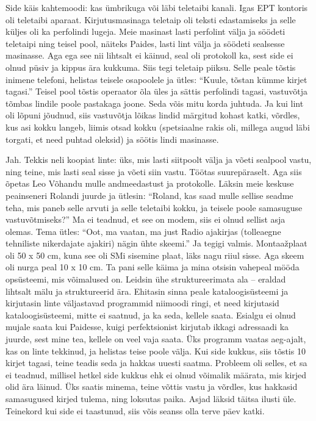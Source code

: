 Side käis kahtemoodi: kas ümbrikuga või läbi teletaibi kanali. Igas EPT 
kontoris oli teletaibi aparaat. Kirjutusmasinaga teletaip oli teksti edastamiseks ja selle küljes oli ka perfolindi lugeja. Meie 
masinast lasti perfolint välja ja söödeti teletaipi ning teisel pool, näiteks 
Paides, lasti lint välja ja söödeti sealsesse masinasse. Aga ega see nii 
lihtsalt ei käinud, seal oli protokoll ka, sest side ei olnud püsiv 
ja kippus ära kukkuma. Siis tegi teletaip piiksu. Selle 
peale tõstis inimene telefoni, helistas teisele osapoolele ja ütles: 
\enquote{Kuule, tõstan kümme kirjet tagasi.} Teisel pool tõstis operaator õla 
üles ja sättis perfolindi tagasi, vastuvõtja tõmbas lindile poole pastakaga 
joone. Seda võis mitu korda juhtuda. Ja kui lint oli lõpuni jõudnud, siis 
vastuvõtja lõikas lindid märgitud kohast katki, võrdles, kus asi kokku langeb, 
liimis otsad kokku (spetsiaalne rakis oli, millega augud läbi torgati, et need 
puhtad oleksid) ja söötis lindi masinasse. 


Jah. Tekkis neli koopiat linte: üks, mis lasti siitpoolt välja ja võeti sealpool 
vastu, ning teine, mis lasti seal sisse ja võeti siin vastu. 
Töötas suurepäraselt. Aga siis õpetas Leo Võhandu mulle andmeedastust ja protokolle. Läksin meie keskuse peainseneri Rolandi 
juurde ja ütlesin: \enquote{Roland, kas saad mulle 
sellise seadme teha, mis paneb selle arvuti ja selle teletaibi kokku, ja 
teisele poole samasuguse vastuvõtmiseks?} Ma ei teadnud, et see on modem, siis 
ei olnud sellist asja olemas. Tema ütles: \enquote{Oot, ma vaatan, ma just Radio ajakirjas (tolleaegne tehniliste nikerdajate ajakiri) nägin ühte skeemi.} Ja tegigi valmis. Montaažplaat oli 50 x 50 
cm, kuna see oli SMi sisemine plaat, läks nagu riiul 
sisse. Aga skeem oli nurga peal 10 x 10 cm. Ta pani selle 
käima ja mina otsisin vahepeal mööda opsüsteemi, mis võimalused on. Leidsin 
ühe struktureerimata ala -- eraldad lihtsalt mälu ja 
struktureerid ära. Ehitasin sinna peale kataloogisüsteemi ja kirjutasin linte väljastavad
programmid niimoodi ringi, et need kirjutasid 
kataloogisüsteemi, mitte ei saatnud, ja ka seda, kellele saata. 
Esialgu ei olnud mujale saata kui Paidesse, kuigi perfektsionist kirjutab ikkagi adressaadi ka juurde, 
sest mine tea, kellele on veel vaja saata. 
Üks programm vaatas aeg-ajalt, kas on linte tekkinud, ja helistas teise poole välja. Kui side 
kukkus, siis tõstis 10 kirjet tagasi, teine teadis seda ja hakkas uuesti saatma. Probleem oli selles, et sa ei teadnud, millisel 
hetkel side kukkus ehk ei olnud võimalik määrata, mis kirjed olid ära läinud. 
Üks saatis minema, teine võttis vastu ja võrdles, kus hakkasid samasugused kirjed 
tulema, ning loksutas paika. Asjad läksid täitsa ilusti üle. Teinekord kui side ei taastunud, siis võis seanss olla terve päev katki.

